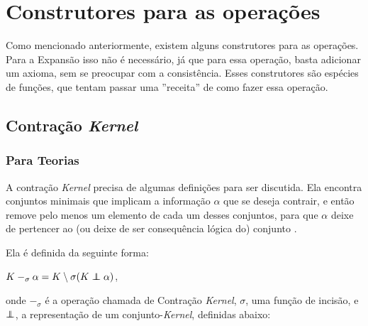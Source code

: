 \section{Construtores para as operações}

Como mencionado anteriormente, existem alguns construtores para as operações. Para a Expansão isso não é necessário, já que para essa operação, basta adicionar um axioma, sem se preocupar com a consistência. Esses construtores são espécies de funções, que tentam passar uma ''receita'' de como fazer essa operação. 

\subsection{Contração \textit{Kernel}}

\subsubsection{Para Teorias}

A contração \textit{Kernel} precisa de algumas definições para ser discutida. Ela encontra conjuntos minimais que implicam a informação $ \alpha $ que se deseja contrair, e então remove pelo menos um elemento de cada um desses conjuntos, para que $ \alpha $ deixe de pertencer ao (ou deixe de ser consequência lógica do) conjunto \citep{revisaoHansson5}. 

Ela é definida da seguinte forma:

\begin{center}
	$ K -_{\sigma} \alpha = K \setminus \sigma(K \kcont \alpha) $,
\end{center}

onde $ -_{\sigma} $ é a operação chamada de Contração \textit{Kernel}, $ \sigma $, uma função de incisão, e $ \kcont $, a representação de um conjunto-\textit{Kernel}, definidas abaixo:

